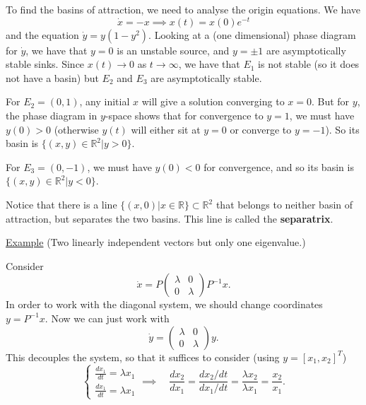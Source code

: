 \documentclass[11pt, letterpaper, oneside]{article}     %
\numberwithin{equation}{subsection}
\theoremstyle{definition}
\numberwithin{theorem}{section}
\theoremstyle{remark}
\newcommand{\RR}{\mathbb{R}}
\begin{document}
\begin{enumerate}
  To find the basins of attraction, we need to analyse the origin equations. We have
  \begin{equation}
    \dot x = -x \implies x(t) = x(0)e^{-t}
  \end{equation}
  and the equation $\dot y = y(1-y^2)$. Looking at a (one dimensional) phase diagram for $\dot y$, we have that $y = 0$ is an unstable source, and $y = \pm 1$ are asymptotically stable sinks. Since $x(t) \to 0$ as $t \to \infty$, we have that $E_1$ is not stable (so it does not have a basin) but $E_2$ and $E_3$ are asymptotically stable.

  For $E_2 = (0,1)$, any initial $x$ will give a solution converging to $x = 0$. But for $y$, the phase diagram in $y$-space shows that for convergence to $y = 1$, we must have $y(0) > 0$ (otherwise $y(t)$ will either sit at $y = 0$ or converge to $y = -1$). So its basin is $\{ (x,y) \in \RR^2 | y > 0\}$.

  For $E_3 = (0,-1)$, we must have $y(0) < 0$ for convergence, and so its basin is $\{(x,y)\in \RR^2 | y < 0\}$.

  Notice that there is a line $\{ (x,0) | x \in \RR\} \subset \RR^2$ that belongs to neither basin of attraction, but separates the two basins. This line is called the \textbf{separatrix}.

  \medskip

  \underline{Example} (Two linearly independent vectors but only one eigenvalue.)

  Consider
  \begin{equation}
    \dot x = P
    \begin{pmatrix}
      \lambda & 0\\
      0 & \lambda
    \end{pmatrix}
    P^{-1} x.
  \end{equation}
  In order to work with the diagonal system, we should change coordinates $y = P^{-1}x$. Now we can just work with
  \begin{equation}
    \dot y =
    \begin{pmatrix}
      \lambda & 0\\
      0 & \lambda
    \end{pmatrix}
    y.
  \end{equation}
  This decouples the system, so that it suffices to consider (using $y = [x_1,x_2]^T$)
  \begin{equation}
    \begin{cases}
      \frac{dx_1}{dt} = \lambda x_1\\
      \frac{dx_1}{dt} = \lambda x_1
    \end{cases}
    \implies\quad
    \frac{dx_2}{dx_1} = \frac{dx_2/dt}{dx_1/dt}
    = \frac{\lambda x_2}{\lambda x_1}
    = \frac{x_2}{x_1}.
  \end{equation}


\end{enumerate}
\end{document}
